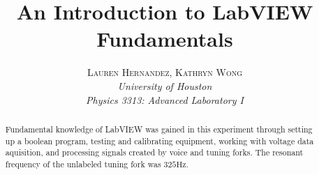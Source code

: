 \documentclass[twoside,10pt]{article}
\title{\vspace{-15mm}\fontsize{15pt}{10pt}\selectfont\textbf{An Introduction to LabVIEW Fundamentals}} %
\author{
	\small
	\textsc{Lauren Hernandez, Kathryn Wong}\\[1mm] %
	\normalsize \textit{University of Houston}\\ %
	\normalsize \textit{Physics 3313: Advanced Laboratory I}\\ %
	\vspace{-10mm}
}
\date{}
\begin{document}
	
	\maketitle %
	
	\thispagestyle{fancy} %
	
	
	\begin{abstract}
		
	\noindent Fundamental knowledge of LabVIEW was gained in this experiment through setting up a boolean program, testing and calibrating equipment, working with voltage data aquisition, and processing signals created by voice and tuning forks. The resonant frequency of the unlabeled tuning fork was $325 \text{Hz}$. 

		
	\end{abstract}
	
	
\end{document}
